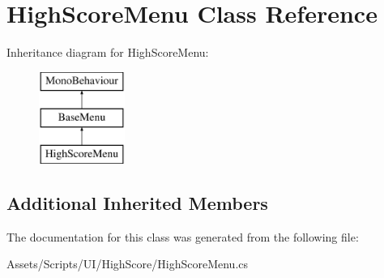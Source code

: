 \hypertarget{class_high_score_menu}{}\section{High\+Score\+Menu Class Reference}
\label{class_high_score_menu}
Inheritance diagram for High\+Score\+Menu\+:\begin{figure}[H]
\begin{center}
\leavevmode
\includegraphics[height=3.000000cm]{class_high_score_menu}
\end{center}
\end{figure}
\subsection*{Additional Inherited Members}


The documentation for this class was generated from the following file\+:\begin{DoxyCompactItemize}
\item 
Assets/\+Scripts/\+U\+I/\+High\+Score/High\+Score\+Menu.\+cs\end{DoxyCompactItemize}
